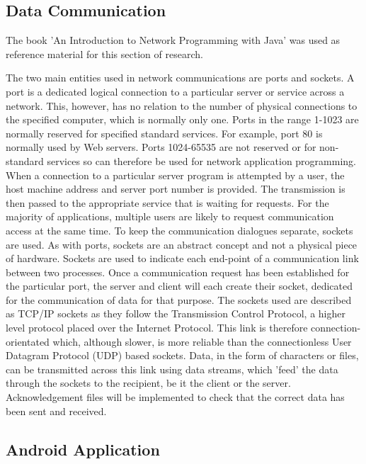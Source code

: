 \documentclass[a4paper,10pt]{report}
\begin{document}

\subsection{Data Communication}

The book 'An Introduction to Network Programming with Java' \cite{javanetworking} was used as reference material for this section of research. 

The two main entities used in network communications are ports and sockets. A port is a dedicated logical connection to a particular server or service across a network. This, however, has no relation to the number of physical connections to the specified computer, which is normally only one. Ports in the range 1-1023 are normally reserved for specified standard services. For example, port 80 is normally used by Web servers. Ports 1024-65535 are not reserved or for non-standard services so can therefore be used for network application programming. When a connection to a particular server program is attempted by a user, the host machine address and server port number is provided. The transmission is then passed to the appropriate service that is waiting for requests. For the majority of applications, multiple users are likely to request communication access at the same time. To keep the communication dialogues separate, sockets are used. As with ports, sockets are an abstract concept and not a physical piece of hardware. Sockets are used to indicate each end-point of a communication link between two processes. Once a communication request has been established for the particular port, the server and client will each create their socket, dedicated for the communication of data for that purpose. The sockets used are described as TCP/IP sockets as they follow the Transmission Control Protocol, a higher level protocol placed over the Internet Protocol. This link is therefore connection-orientated which, although slower, is more reliable than the connectionless User Datagram Protocol (UDP) based sockets. Data, in the form of characters or files, can be transmitted across this link using data streams, which 'feed' the data through the sockets to the recipient, be it the client or the server. Acknowledgement files will be implemented to check that the correct data has been sent and received.

\subsection{Android Application}
\end{document}
